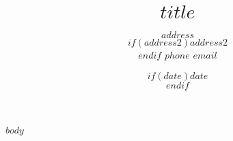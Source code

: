 \documentclass[11pt, a4paper]{article}
\title{$title$} %
\date{$if(date)$$date$\\$endif$} %
\author{$address$\\$if(address2)$$address2$\\$endif$
$phone$ \textbar{} $email$ }
\begin{document}
\maketitle
\begin{raggedright}
$body$
\end{raggedright}
\end{document}

